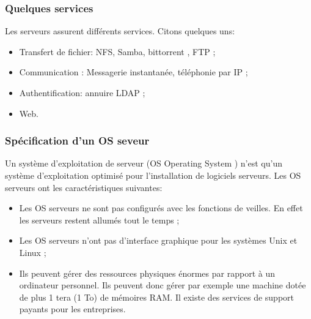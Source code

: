\documentclass[a4paper,12pt,french]{report} %
\begin{document}
\subsubsection{Quelques services}
Les serveurs assurent différents services. Citons quelques uns:
\begin{itemize}
\item Transfert de fichier: NFS, Samba, bittorrent , FTP ;
\item Communication : Messagerie instantanée, téléphonie par IP ;
\item Authentification: annuire LDAP ;
\item Web.
\end{itemize}

\subsubsection{Spécification d'un OS seveur}
	Un système d'exploitation de serveur (OS Operating System ) n'est qu'un système d'exploitation optimisé pour l'installation de logiciels serveurs. Les OS serveurs ont les caractéristiques suivantes:
\begin{itemize}
	\item Les OS serveurs ne sont pas configurés avec les fonctions de veilles. En effet les serveurs restent allumés tout le temps ;
	\item Les OS serveurs n'ont pas d'interface graphique pour les systèmes Unix et Linux ;
	\item Ils peuvent gérer des ressources physiques énormes par rapport à un ordinateur personnel. Ils peuvent donc gérer par exemple une machine dotée de plus 1 tera (1 To) de mémoires RAM. Il existe des services de support payants pour les entreprises.
\end{itemize} 
	
\end{document}
